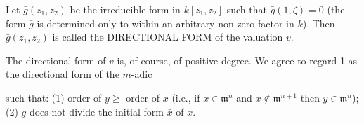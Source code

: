 Let $\bar{g}(z_1, z_2)$ be the irreducible form in $k[z_1, z_2]$ such that $\bar{g}(1, \zeta) = 0$ (the form $\bar{g}$ is determined only to within an arbitrary non-zero factor in $k$). Then $\bar{g}(z_1, z_2)$ is called the DIRECTIONAL FORM of the valuation $v$.

The directional form of $v$ is, of course, of positive degree. We agree to regard 1 as the directional form of the $m$-adic

such that: (1) order of $y \geq$ order of $x$ (i.e., if $x \in \mathfrak{m}^n$ and $x \notin \mathfrak{m}^{n+1}$ then $y \in \mathfrak{m}^n$); (2) $\bar{g}$ does not divide the initial form $\bar{x}$ of $x$.